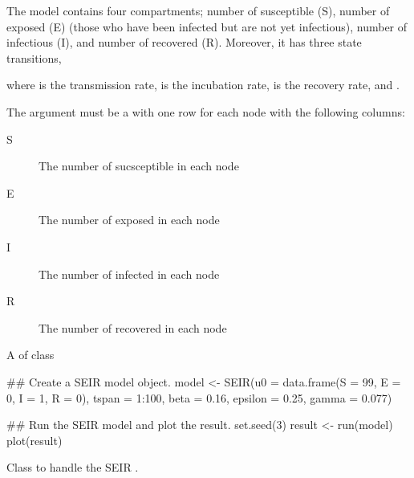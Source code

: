 \documentclass[letterpaper]{book}
\begin{document}
\begin{Details}
The  model contains four compartments; number of
susceptible (S), number of exposed (E) (those who have been
infected but are not yet infectious), number of infectious (I),
and number of recovered (R).  Moreover, it has three state
transitions,


where \eqn{\beta}{} is the transmission rate, \eqn{\epsilon}{} is the
incubation rate, \eqn{\gamma}{} is the recovery rate, and
.

The argument  must be a  with one row for
each node with the following columns:
\begin{description}

\item[S] The number of sucsceptible in each node
\item[E] The number of exposed in each node
\item[I] The number of infected in each node
\item[R] The number of recovered in each node

\end{description}

\end{Details}
%
\begin{Value}
A  of class 
\end{Value}
%
\begin{Examples}
\begin{ExampleCode}
## Create a SEIR model object.
model <- SEIR(u0 = data.frame(S = 99, E = 0, I = 1, R = 0),
              tspan = 1:100,
              beta = 0.16,
              epsilon = 0.25,
              gamma = 0.077)

## Run the SEIR model and plot the result.
set.seed(3)
result <- run(model)
plot(result)
\end{ExampleCode}
\end{Examples}
%
\begin{Description}
Class to handle the SEIR .
\end{Description}
\end{document}
